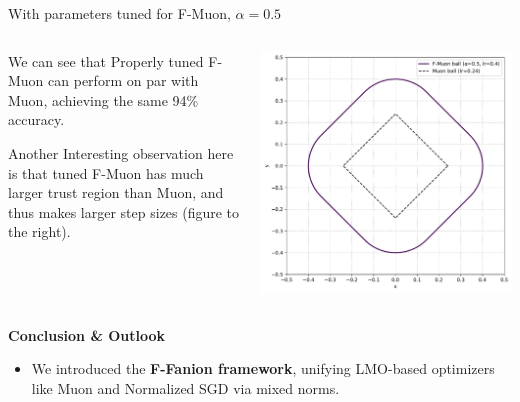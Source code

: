 \documentclass[fontsize=10pt]{beamer}
\begin{document}
\begin{frame}[fragile]
\begin{columns}[T]
\begin{column}{0.30\textwidth}
\begin{columns}[T,totalwidth=\textwidth]
\begin{column}{0.48\textwidth}
        {\centering With parameters tuned for F-Muon, $\alpha = 0.5$\par}
      \end{column}
    \end{columns}\vspace{1em}

\begin{columns}[T,totalwidth=\textwidth]
  \begin{column}{0.47\textwidth}
    \setlength{\parskip}{0.7em}
\setlength{\parindent}{0pt}
\Large
    We can see that Properly tuned F-Muon can perform on par with Muon, achieving the same 94\% accuracy. 
    
    Another Interesting observation here is that tuned F-Muon has much larger trust region than Muon, and thus makes larger step sizes (figure to the right).
  \end{column}
  \begin{column}{0.49\textwidth}
    \includegraphics[width=\linewidth]{fstardual_cifar.pdf}
    \centering
  \end{column}
\end{columns}

\vspace{0.5em}
\textbf{\Huge\color{Zen}Conclusion \& Outlook}\\[0.6em]

\begin{itemize}
    \item We introduced the \textbf{\color{HazySummerEve}F-Fanion framework}, unifying LMO-based optimizers like Muon and Normalized SGD via mixed norms. 


\end{itemize}
\end{column}
\end{columns}
\end{frame}
\end{document}
